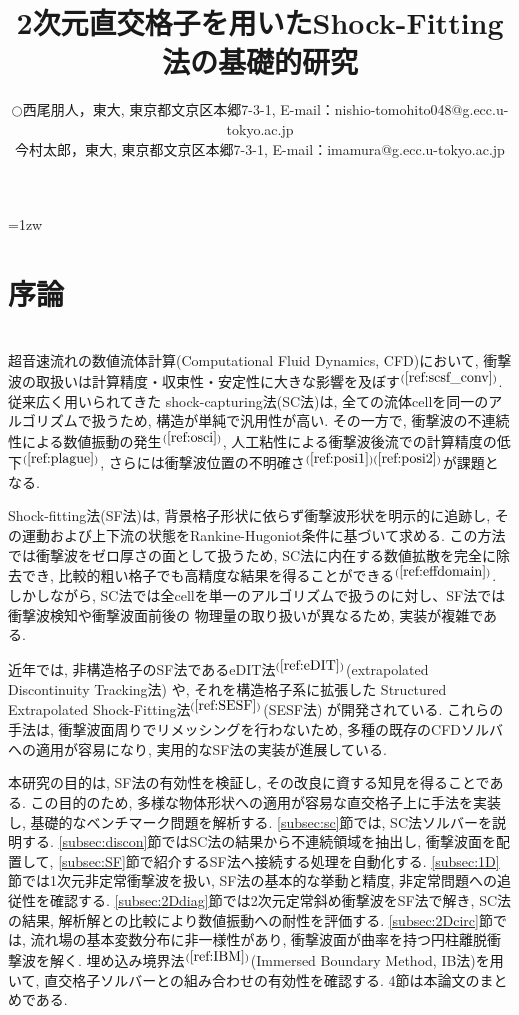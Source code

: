 \documentclass[a4j]{jarticle}
\title{2次元直交格子を用いたShock-Fitting法の基礎的研究}   %
\author{\begin{tabular}{cl}
$\bigcirc$ & 西尾朋人，東大, 
             東京都文京区本郷7-3-1, 
             E-mail：nishio-tomohito048@g.ecc.u-tokyo.ac.jp \\
           & 今村太郎，東大,
             東京都文京区本郷7-3-1, 
             E-mail：imamura@g.ecc.u-tokyo.ac.jp
\end{tabular} }
\begin{document}
\baselineskip=1zw
\maketitle

\section{序論} \label{sec:intro}
\mbox{}\\[-3.0ex]

超音速流れの数値流体計算(Computational Fluid Dynamics, CFD)において, 衝撃波の取扱いは計算精度・収束性・安定性に大きな影響を及ぼす$^{(\ref{ref:scsf_conv})}$.
従来広く用いられてきた shock-capturing法(SC法)は, 全ての流体cellを同一のアルゴリズムで扱うため, 構造が単純で汎用性が高い. 
その一方で, 衝撃波の不連続性による数値振動の発生$^{(\ref{ref:osci})}$,
人工粘性による衝撃波後流での計算精度の低下$^{(\ref{ref:plague})}$, さらには衝撃波位置の不明確さ$^{(\ref{ref:posi1})(\ref{ref:posi2})}$が課題となる.

Shock-fitting法(SF法)は, 背景格子形状に依らず衝撃波形状を明示的に追跡し, 
その運動および上下流の状態をRankine-Hugoniot条件に基づいて求める.
この方法では衝撃波をゼロ厚さの面として扱うため, SC法に内在する数値拡散を完全に除去でき, 
比較的粗い格子でも高精度な結果を得ることができる$^{(\ref{ref:effdomain})}$. 
しかしながら, SC法では全cellを単一のアルゴリズムで扱うのに対し、SF法では衝撃波検知や衝撃波面前後の
物理量の取り扱いが異なるため, 実装が複雑である.

近年では, 非構造格子のSF法であるeDIT法$^{(\ref{ref:eDIT})}$(extrapolated Discontinuity Tracking法) や, 
それを構造格子系に拡張した Structured Extrapolated Shock-Fitting法$^{(\ref{ref:SESF})}$(SESF法) が開発されている.
これらの手法は, 衝撃波面周りでリメッシングを行わないため,  
多種の既存のCFDソルバへの適用が容易になり, 実用的なSF法の実装が進展している.

本研究の目的は, SF法の有効性を検証し, その改良に資する知見を得ることである.
この目的のため, 多様な物体形状への適用が容易な直交格子上に手法を実装し, 基礎的なベンチマーク問題を解析する.
\ref{subsec:sc}節では, SC法ソルバーを説明する.
\ref{subsec:discon}節ではSC法の結果から不連続領域を抽出し, 衝撃波面を配置して, 
\ref{subsec:SF}節で紹介するSF法へ接続する処理を自動化する.
\ref{subsec:1D}節では1次元非定常衝撃波を扱い, SF法の基本的な挙動と精度, 非定常問題への追従性を確認する.
\ref{subsec:2Ddiag}節では2次元定常斜め衝撃波をSF法で解き, SC法の結果, 解析解との比較により数値振動への耐性を評価する.
\ref{subsec:2Dcirc}節では, 流れ場の基本変数分布に非一様性があり, 衝撃波面が曲率を持つ円柱離脱衝撃波を解く.
埋め込み境界法$^{(\ref{ref:IBM})}$(Immersed Boundary Method, IB法)を用いて, 
直交格子ソルバーとの組み合わせの有効性を確認する.
4節は本論文のまとめである.
\end{document}
